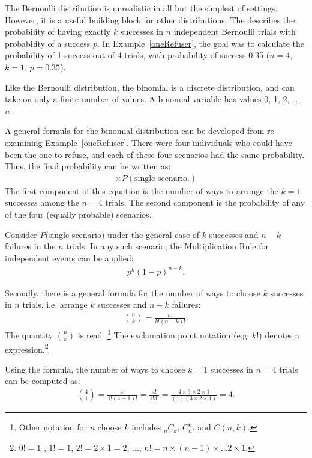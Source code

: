 The Bernoulli distribution is unrealistic in all but the simplest of settings. However, it is a useful building block for other distributions. The  describes the probability of having exactly $k$ successes in $n$ independent Bernoulli trials with probability of a success $p$. In Example~\ref{oneRefuser}, the goal was to calculate the probability of 1 success out of 4 trials, with probability of success 0.35 ($n=4$, $k=1$, $p=0.35$). 

Like the Bernoulli distribution, the binomial is a discrete distribution, and can take on only a finite number of values. A binomial variable has values 0, 1, 2, \dots, $n$.

A general formula for the binomial distribution can be developed from re-examining Example~\ref{oneRefuser}. There were four individuals who could have been the one to refuse, and each of these four scenarios had the same probability. Thus, the final probability can be written as:
\begin{eqnarray}
[\text{\# of scenarios}] \times P(\text{single scenario}.)
\label{genBinomialFormula}
\end{eqnarray}
The first component of this equation is the number of ways to arrange the $k=1$ successes among the $n=4$ trials. The second component is the probability of any of the four (equally probable) scenarios.

Consider $P($single scenario$)$ under the general case of $k$ successes and $n-k$ failures in the $n$ trials. In any such scenario, the Multiplication Rule for independent events can be applied:
\begin{eqnarray*}
	p^k(1-p)^{n-k}.
\end{eqnarray*}

Secondly, there is a general formula for the number of ways to choose $k$ successes in $n$ trials, i.e. arrange $k$ successes and $n-k$ failures:
\begin{eqnarray*}
	{n\choose k} = \frac{n!}{k!(n-k)!}.
\end{eqnarray*}
The quantity ${n\choose k}$ is read .\footnote{Other notation for $n$ choose $k$ includes $_nC_k$, $C_n^k$, and $C(n,k)$.} The exclamation point notation (e.g. $k!$) denotes a \label{factorialDefinitionInTheBinomialSection} expression.\footnote{$0! = 1$ \label{zeroFactorial}, $1! = 1$, $2! = 2 \times 1 = 2$, $\dots$, $n! = n\times (n-1) \times \dots 2 \times 1$.}

Using the formula, the number of ways to choose $k=1$ successes in $n=4$ trials can be computed as:
\begin{eqnarray*}
	{4 \choose 1} = \frac{4!}{1!(4-1)!} =  \frac{4!}{1!3!} 
	= \frac{4\times3\times2\times1}{(1)(3\times2\times1)} = 4.
\end{eqnarray*}

